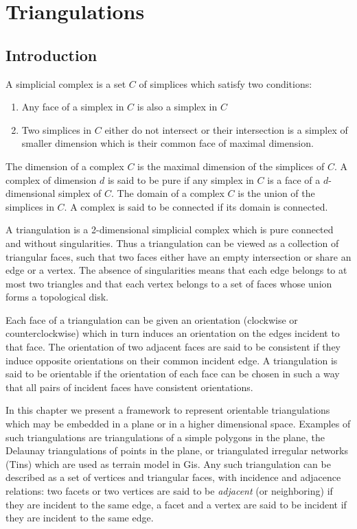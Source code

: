\newcommand{\triangulationcomment}[1]{}

\chapter{Triangulations} \label{I1_Chapter_Triangulations}

\section{Introduction}

A simplicial complex is a set ${C}$ of simplices which satisfy
two conditions:
\begin{enumerate}
\item Any face of a simplex in ${  C}$ is also a simplex in ${  C}$
\item Two simplices in ${  C}$ either do not intersect
or their intersection is  a simplex of smaller dimension
which is their common face of maximal dimension.
\end{enumerate}
The dimension of a complex ${  C}$ is the maximal dimension 
of the simplices
of ${  C}$. A complex of dimension $d$ is said to be pure
if any simplex in ${  C}$ is a face of a $d$-dimensional
simplex of ${  C}$.
The domain of a complex ${  C}$ is the union of the simplices
in ${  C}$. A complex is said to be connected if its domain is connected.

A 
triangulation is a 2-dimensional simplicial complex which is pure
connected and without singularities. Thus a triangulation
can be viewed as a collection of triangular faces,
such that two faces either have an empty intersection or share an edge or a vertex.
The absence of singularities means that each edge belongs to 
at most two triangles and that each vertex belongs  to a set  of faces
whose union forms a topological disk.

Each face of a triangulation can be given an orientation
(clockwise or counterclockwise) which in turn induces an orientation
on the edges incident to that face. The orientation of two adjacent
faces are said to be consistent if they induce
opposite orientations on their common incident edge.
A triangulation is said to be orientable if 
the orientation of each face can be chosen in such a way
that all pairs of incident faces have consistent orientations. 


In this chapter we present a framework to represent
orientable triangulations which  may  be embedded 
in a plane or in a higher dimensional space.
Examples of such triangulations 
are triangulations of a simple polygons in the plane, the
Delaunay triangulations of points in the plane, or triangulated
irregular networks ({\sc Tin}s) which are used as terrain model in
{\sc Gis}.  
Any such  triangulation can be described as a set of  vertices and
triangular faces,  with incidence and adjacence relations:
two facets or two vertices are said to be {\em adjacent}
 (or neighboring) if they are incident to the same edge,
a facet and a vertex are said to be incident if they are incident to the same
edge.

